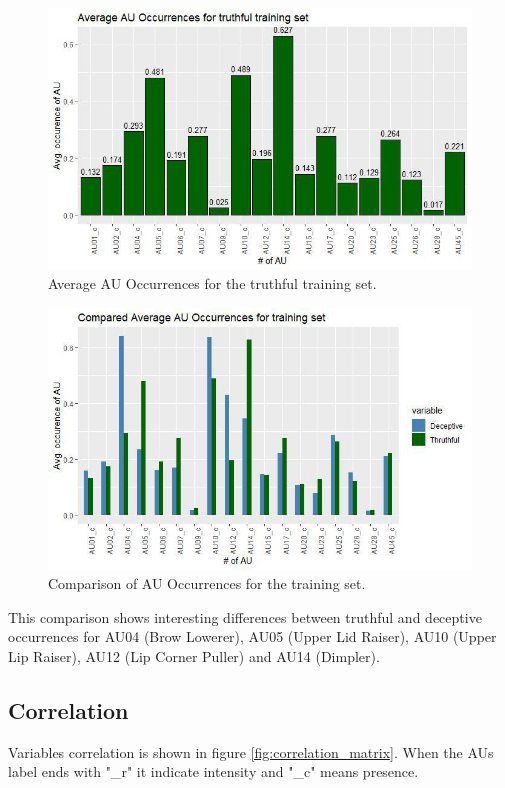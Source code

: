 \clearpage

\begin{figure}[H]
	\centering
	\includegraphics[width=1\textwidth]{images/au_occ_truth}
	\caption{Average AU Occurrences for the truthful training set.}
	\label{fig:au_occ_truth}
\end{figure}

\begin{figure}[H]
	\centering
	\includegraphics[width=1\textwidth]{images/au_occ_comp}
	\caption{Comparison of AU Occurrences for the training set.}
	\label{fig:au_occ_comp}
\end{figure}

This comparison shows interesting differences between truthful and deceptive occurrences for AU04 (Brow Lowerer), AU05 (Upper Lid Raiser), AU10 (Upper Lip Raiser), AU12 (Lip Corner Puller) and AU14 (Dimpler). %

\subsection{Correlation} \label{corr}
Variables correlation is shown in figure \ref{fig:correlation_matrix}. When the AUs label ends with "\_r" it indicate intensity and "\_c" means presence.

